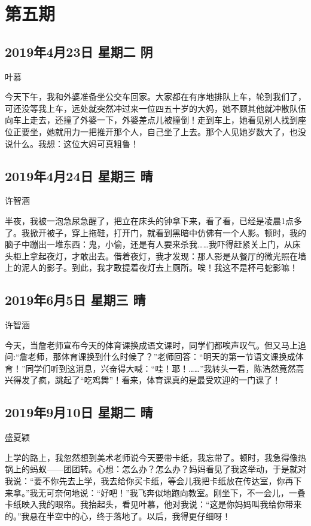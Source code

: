 \chapter{第五期}

\section{2019年4月23日 星期二 阴}

叶慕

今天下午，我和外婆准备坐公交车回家。大家都在有序地排队上车，轮到我们了，可还没等我上车，远处就突然冲过来一位四五十岁的大妈，她不顾其他就冲散队伍向车上走去，还撞了外婆一下，外婆差点儿被撞倒！走到车上，她看见别人找到座位正要坐，她就用力一把推开那个人，自己坐了上去。那个人见她岁数大了，也没说什么。我想：这位大妈可真粗鲁！

\section{2019年4月24日 星期三 晴}

许智涵

半夜，我被一泡急尿急醒了，把立在床头的钟拿下来，看了看，已经是凌晨1点多了。我掀开被子，穿上拖鞋，打开门，就看到黑暗中仿佛有一个人影。顿时，我的脑子中蹦出一堆东西：鬼，小偷，还是有人要来杀我\ldots\ldots 我吓得赶紧关上门，从床头柜上拿起夜灯，才敢出去。借着夜灯，我才发现：那人影是从餐厅的微光照在墙上的泥人的影子。到此，我才敢提着夜灯去上厕所。唉！我这不是杯弓蛇影嘛！

\section{2019年6月5日 星期三 晴}

许智涵

今天，当詹老师宣布今天的体育课换成语文课时，同学们都唉声叹气。但又马上追问:``詹老师，那体育课换到什么时候了？''老师回答：``明天的第一节语文课换成体育！''同学们听到这消息，兴奋得大喊：``哇！耶！\ldots\ldots{}''我转头一看，陈浩然竟然高兴得发了疯，跳起了``吃鸡舞''！看来，体育课真的是最受欢迎的一门课了！

\section{2019年9月10日 星期二 晴}

盛夏颖

上学的路上，我忽然想到美术老师说今天要带卡纸，我忘带了。顿时，我急得像热锅上的蚂蚁------团团转。心想：怎么办？怎么办？妈妈看见了我这举动，于是就对我说：``要不你先去上学，我去给你买卡纸，等会儿我把卡纸放在传达室，你再下来拿。''我无可奈何地说：``好吧！''我飞奔似地跑向教室。刚坐下，不一会儿，一叠卡纸映入我的眼帘。我抬起头，看见叶慕，他对我说：``这是你妈妈叫我给你带来的。''我悬在半空中的心，终于落地了。以后，我得更仔细呀！


